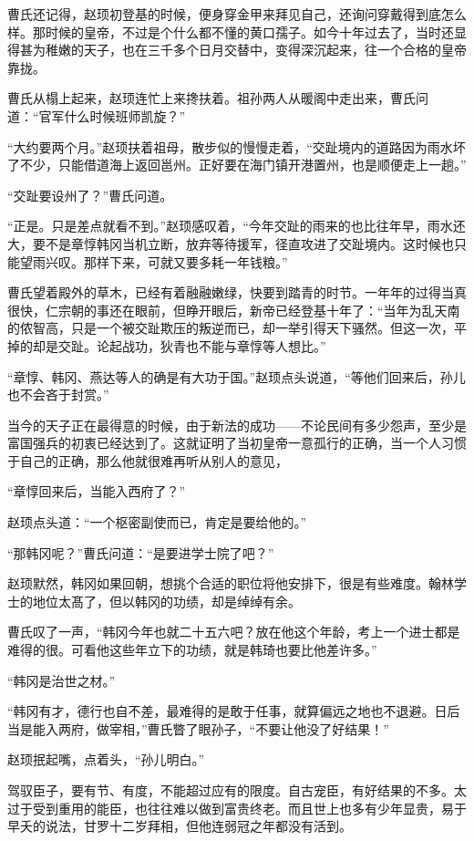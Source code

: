 曹氏还记得，赵顼初登基的时候，便身穿金甲来拜见自己，还询问穿戴得到底怎么样。那时候的皇帝，不过是个什么都不懂的黄口孺子。如今十年过去了，当时还显得甚为稚嫩的天子，也在三千多个日月交替中，变得深沉起来，往一个合格的皇帝靠拢。

曹氏从榻上起来，赵顼连忙上来搀扶着。祖孙两人从暖阁中走出来，曹氏问道：“官军什么时候班师凯旋？”

“大约要两个月。”赵顼扶着祖母，散步似的慢慢走着，“交趾境内的道路因为雨水坏了不少，只能借道海上返回邕州。正好要在海门镇开港置州，也是顺便走上一趟。”

“交趾要设州了？”曹氏问道。

“正是。只是差点就看不到。”赵顼感叹着，“今年交趾的雨来的也比往年早，雨水还大，要不是章惇韩冈当机立断，放弃等待援军，径直攻进了交趾境内。这时候也只能望雨兴叹。那样下来，可就又要多耗一年钱粮。”

曹氏望着殿外的草木，已经有着融融嫩绿，快要到踏青的时节。一年年的过得当真很快，仁宗朝的事还在眼前，但睁开眼后，新帝已经登基十年了：“当年为乱天南的侬智高，只是一个被交趾欺压的叛逆而已，却一举引得天下骚然。但这一次，平掉的却是交趾。论起战功，狄青也不能与章惇等人想比。”

“章惇、韩冈、燕达等人的确是有大功于国。”赵顼点头说道，“等他们回来后，孙儿也不会吝于封赏。”

当今的天子正在最得意的时候，由于新法的成功——不论民间有多少怨声，至少是富国强兵的初衷已经达到了。这就证明了当初皇帝一意孤行的正确，当一个人习惯于自己的正确，那么他就很难再听从别人的意见，

“章惇回来后，当能入西府了？”

赵顼点头道：“一个枢密副使而已，肯定是要给他的。”

“那韩冈呢？”曹氏问道：“是要进学士院了吧？”

赵顼默然，韩冈如果回朝，想挑个合适的职位将他安排下，很是有些难度。翰林学士的地位太髙了，但以韩冈的功绩，却是绰绰有余。

曹氏叹了一声，“韩冈今年也就二十五六吧？放在他这个年龄，考上一个进士都是难得的很。可看他这些年立下的功绩，就是韩琦也要比他差许多。”

“韩冈是治世之材。”

“韩冈有才，德行也自不差，最难得的是敢于任事，就算偏远之地也不退避。日后当是能入两府，做宰相，”曹氏瞥了眼孙子，“不要让他没了好结果！”

赵顼抿起嘴，点着头，“孙儿明白。”

驾驭臣子，要有节、有度，不能超过应有的限度。自古宠臣，有好结果的不多。太过于受到重用的能臣，也往往难以做到富贵终老。而且世上也多有少年显贵，易于早夭的说法，甘罗十二岁拜相，但他连弱冠之年都没有活到。

